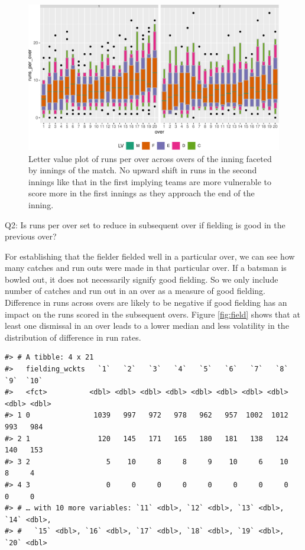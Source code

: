 \documentclass[12pt]{article}
\begin{document}
\begin{figure}

{\centering \includegraphics[width=\textwidth]{figure/cricex-1} 

}

\caption{Letter value plot of runs per over across overs of the inning faceted by innings of the match. No upward shift in runs in the second innings like that in the first implying teams are more vulnerable to score more in the first innings as they approach the end of the inning.}\label{fig:cricex}
\end{figure}

Q2: Is runs per over set to reduce in subsequent over if fielding is good in the previous over?

For establishing that the fielder fielded well in a particular over, we can see how many catches and run outs were made in that particular over. If a batsman is bowled out, it does not necessarily signify good fielding. So we only include number of catches and run out in an over as a measure of good fielding. Difference in runs across overs are likely to be negative if good fielding has an impact on the runs scored in the subsequent overs. Figure \ref{fig:field} shows that at least one dismissal in an over leads to a lower median and less volatility in the distribution of difference in run rates.

\begin{verbatim}
#> # A tibble: 4 x 21
#>   fielding_wckts   `1`   `2`   `3`   `4`   `5`   `6`   `7`   `8`   `9`  `10`
#>   <fct>          <dbl> <dbl> <dbl> <dbl> <dbl> <dbl> <dbl> <dbl> <dbl> <dbl>
#> 1 0               1039   997   972   978   962   957  1002  1012   993   984
#> 2 1                120   145   171   165   180   181   138   124   140   153
#> 3 2                  5    10     8     8     9    10     6    10     8     4
#> 4 3                  0     0     0     0     0     0     0     0     0     0
#> # … with 10 more variables: `11` <dbl>, `12` <dbl>, `13` <dbl>, `14` <dbl>,
#> #   `15` <dbl>, `16` <dbl>, `17` <dbl>, `18` <dbl>, `19` <dbl>, `20` <dbl>
\end{verbatim}
\end{document}
